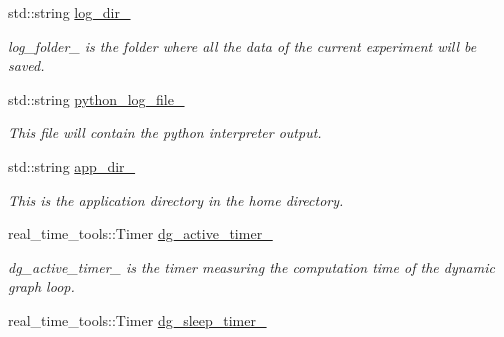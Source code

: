 \begin{DoxyCompactItemize}
std\+::string \hyperlink{classdynamic__graph_1_1DynamicGraphManager_ace11054bf618c29e4fda9a77905e8ff0}{log\+\_\+dir\+\_\+}
\begin{DoxyCompactList}\small\item\em log\+\_\+folder\+\_\+ is the folder where all the data of the current experiment will be saved. \end{DoxyCompactList}\item 
\mbox{\label{classdynamic__graph_1_1DynamicGraphManager_ac3be4a8d0596390bc5dd055321a7df55}} 
std\+::string \hyperlink{classdynamic__graph_1_1DynamicGraphManager_ac3be4a8d0596390bc5dd055321a7df55}{python\+\_\+log\+\_\+file\+\_\+}
\begin{DoxyCompactList}\small\item\em This file will contain the python interpreter output. \end{DoxyCompactList}\item 
\mbox{\label{classdynamic__graph_1_1DynamicGraphManager_a1f413dd58d270daf3c03f08d4a2c51cb}} 
std\+::string \hyperlink{classdynamic__graph_1_1DynamicGraphManager_a1f413dd58d270daf3c03f08d4a2c51cb}{app\+\_\+dir\+\_\+}
\begin{DoxyCompactList}\small\item\em This is the application directory in the home directory. \end{DoxyCompactList}\item 
\mbox{\label{classdynamic__graph_1_1DynamicGraphManager_a8f206d87817177e389df0c27f1954f51}} 
real\+\_\+time\+\_\+tools\+::\+Timer \hyperlink{classdynamic__graph_1_1DynamicGraphManager_a8f206d87817177e389df0c27f1954f51}{dg\+\_\+active\+\_\+timer\+\_\+}
\begin{DoxyCompactList}\small\item\em dg\+\_\+active\+\_\+timer\+\_\+ is the timer measuring the computation time of the dynamic graph loop. \end{DoxyCompactList}\item 
\mbox{\label{classdynamic__graph_1_1DynamicGraphManager_a8e0eb495ce07011796c58f54cef16ef5}} 
real\+\_\+time\+\_\+tools\+::\+Timer \hyperlink{classdynamic__graph_1_1DynamicGraphManager_a8e0eb495ce07011796c58f54cef16ef5}{dg\+\_\+sleep\+\_\+timer\+\_\+}

\end{DoxyCompactItemize}
